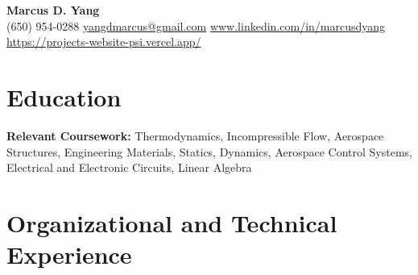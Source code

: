 \newcommand{\entrygap}{\vspace{2pt}}



\begin{center}
  {\fontsize{17}{20}\selectfont\bfseries Marcus D. Yang}\\[2pt]
  {\footnotesize (650) 954-0288 \textbar{} \href{mailto:yangdmarcus@gmail.com}{yangdmarcus@gmail.com} \textbar{} \href{https://www.linkedin.com/in/marcusdyang}{www.linkedin.com/in/marcusdyang} \textbar{} \href{https://projects-website-psi.vercel.app/}{https://projects-website-psi.vercel.app/}}
\end{center}

\section{Education}
\textbf{Relevant Coursework:} Thermodynamics, Incompressible Flow, Aerospace Structures, Engineering Materials, Statics, Dynamics, Aerospace Control Systems, Electrical and Electronic Circuits, Linear Algebra

\section{Organizational and Technical Experience}

